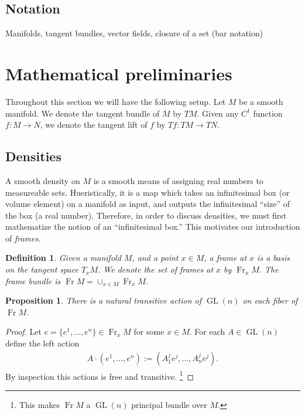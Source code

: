\documentclass[letterpaper, 12 pt]{amsart}
\newtheorem{defn}[thm]{Definition}
\newtheorem{prop}[thm]{Proposition}
\DeclareMathOperator{\Fr}{Fr}
\DeclareMathOperator{\GL}{GL}
\begin{document}
\subsection{Notation}
  Manifolds, tangent bundles, vector fields, closure of a set (bar notation)

\section{Mathematical preliminaries}
\label{sec:math}
  Throughout this section we will have the following
  setup.  Let $M$ be a smooth manifold.
  We denote the tangent bundle of $M$ by $TM$.
  Given any $C^1$ function $f:M \to N$,
  we denote the tangent lift of $f$ by $Tf:TM \to TN$.

\subsection{Densities}
  A smooth density on $M$ is a smooth means of
  assigning real numbers to measureable sets.
  Hueristically, it is a map which
  takes an infinitesimal box (or volume element)
  on a manifold as input, and outputs the infinitesimal ``size''
  of the box (a real number).
  Therefore, in order to discuss densities,
  we must first mathematize the notion of an ``infinitesimal box.''
  This motivates our introduction of \emph{frames}.
  \begin{defn}
  \label{eq:frame_bundle}
    Given a manifold $M$, and a point $x \in M$,
    a \emph{frame at $x$} is a basis on the tangent space $T_x M$.
    We denote the set of frames at $x$ by $\Fr_x M$.
    The frame bundle is $\Fr M = \cup_{x \in M} \Fr_x M$.
  \end{defn}

  \begin{prop}
    There is a natural transitive
    action of $\GL(n)$ on each fiber of $\Fr M$.
  \end{prop}

  \begin{proof}
    Let $e = \{ e^1,\dots,e^n \} \in \Fr_x M$ for some $x \in M$.
    For each $A \in \GL(n)$ define the left action
    \begin{align*}
      A \cdot (e^1,\dots,e^n) := (A^j_1 e^j , \dots, A_n^j e^j ). 
    \end{align*}
    By inspection this actions is free and transitive.
    \footnote{This makes $\Fr M$ a $\GL(n)$ principal bundle over $M$.}
  \end{proof}
\end{document}
